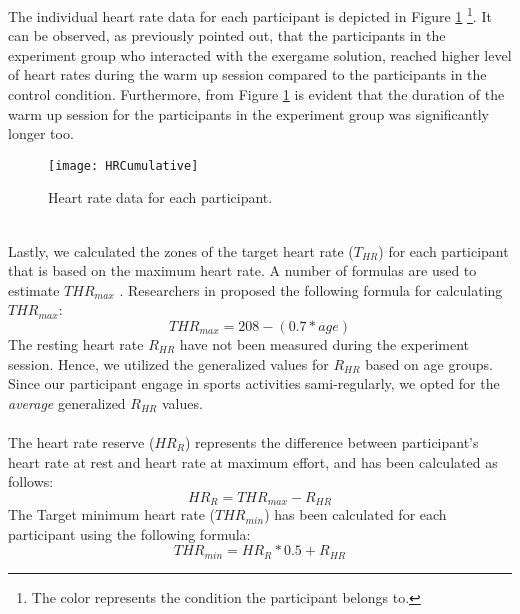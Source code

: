The individual heart rate data for each participant is depicted in Figure \ref{fig:hrCumulative}  \footnote{The color represents the condition the participant belongs to.}. It can be observed, as previously pointed out, that the participants in the experiment group who interacted with the exergame solution, reached higher level of heart rates during the warm up session compared to the participants in the control condition. Furthermore, from Figure \ref{fig:hrCumulative} is evident that the duration of the warm up session for the participants in the experiment group was significantly longer too.\\
\begin{figure}[h]
    \centering
    \texttt{[image: HRCumulative]}
    \caption{Heart rate data for each participant.}
    \label{fig:hrCumulative}
\end{figure}\\
Lastly, we calculated the zones of the target heart rate (\begin{math} T_{HR}\end{math}) for each participant that is based on the maximum heart rate. A number of formulas are used to estimate  \begin{math} THR_{max}\end{math} \cite{heartRate}. Researchers in \cite{tanaka2001age} proposed the following formula for calculating \begin{math}THR_{max}\end{math}:\\
\begin{equation}
THR_{max} = 208-(0.7 * age)
\end{equation}The resting heart rate \begin{math} R_{HR}\end{math} have not been measured during the experiment session. Hence, we utilized the generalized values for \begin{math} R_{HR}\end{math} based on age groups. Since our participant engage in sports activities sami-regularly, we opted for the \textit{average} generalized \begin{math} R_{HR}\end{math} values. \\\\The heart rate reserve (\begin{math} HR_{R}\end{math}) represents the difference between participant's heart rate at rest and heart rate at maximum effort, and has been calculated as follows: \begin{equation}
HR_{R} = THR_{max} - R_{HR} 
\end{equation}The Target minimum heart rate (\begin{math} THR_{min}\end{math}) has been calculated for each participant using the following formula:\begin{equation}
THR_{min} =  HR_{R}*0.5 + R_{HR} 
\end{equation}
